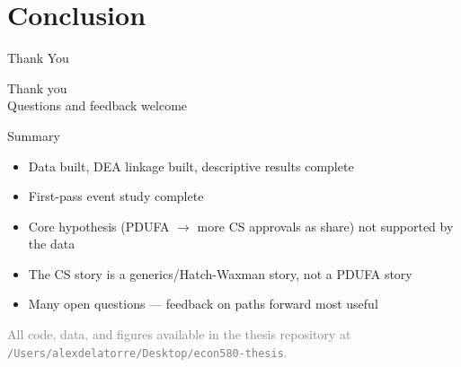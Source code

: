 \documentclass[10pt]{beamer}
\newcommand{\src}[1]{{\tiny\textcolor{gray}{#1}}}
\begin{document}
\section{Conclusion}

\begin{frame}[t]{Thank You}
  \begin{center}
    \Large Thank you \\[1em]
    \normalsize Questions and feedback welcome
  \end{center}

  \bigskip
  \begin{block}{Summary}
    \begin{itemize}
      \item Data built, DEA linkage built, descriptive results complete
      \item First-pass event study complete
      \item Core hypothesis (PDUFA $\to$ more CS approvals as share) not
            supported by the data
      \item The CS story is a generics/Hatch-Waxman story, not a PDUFA story
      \item Many open questions --- feedback on paths forward most useful
    \end{itemize}
  \end{block}

  \bigskip
  \src{All code, data, and figures available in the thesis repository at
  \texttt{/Users/alexdelatorre/Desktop/econ580-thesis}.}
\end{frame}
\end{document}
